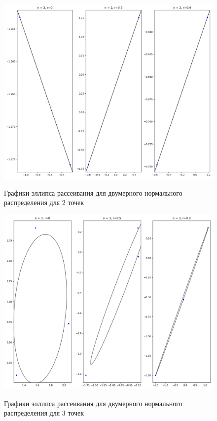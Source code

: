 \documentclass[a4]{article}
\begin{document}
\begin{figure}[H]
	\centering
	\caption{Графики эллипса рассеивания для двумерного нормального распределения для $ 2 $ точек }
	\includegraphics[scale = 0.5]{ellipse_n=2.png} 
	\label{fig:dis_norm_gis2}
\end{figure}

\begin{figure}[H]
	\centering
	\caption{Графики эллипса рассеивания для двумерного нормального распределения для $ 3 $ точек }
	\includegraphics[scale = 0.5]{ellipse_n=3.png} 
	\label{fig:dis_norm_gis2}
\end{figure}
\end{document}
